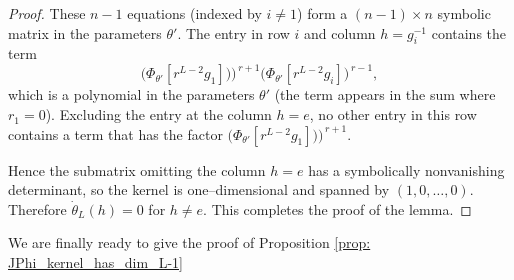 \documentclass[final]{article}
\theoremstyle{definition}
\theoremstyle{plain}
\begin{document}
\begin{proof}
These $n-1$ equations (indexed by $i\ne1$) form a $(n-1)\times n$ symbolic matrix in the parameters $\theta'$.
The entry in row $i$ and column $h=g_i^{-1}$ contains the term
\[
\bigl(\Phi_{\theta'}[r^{L-2}g_1])\bigr)^{\,r+1}
\bigl(\Phi_{\theta'}[r^{L-2}g_i]\bigr)^{\,r-1},
\]
which is a polynomial in the parameters $\theta'$ (the term appears in the sum  where $r_1=0$). 
Excluding the entry at the column $h=e$, no other entry in this row contains a term that has the factor  $\bigl(\Phi_{\theta'}[r^{L-2}g_1])\bigr)^{\,r+1}$.

Hence the submatrix omitting the column $h=e$ has a symbolically nonvanishing determinant, so the kernel is one--dimensional and spanned by $(1,0,\dots,0)$. Therefore $\dot\theta_L(h) = 0$ for $h\neq e$. This completes the proof of the lemma.
\end{proof}



We are finally ready to give the proof of Proposition \ref{prop: JPhi_kernel_has_dim_L-1}
\end{document}

